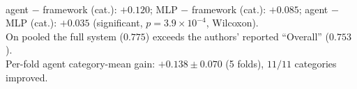 \documentclass[sn-basic]{sn-jnl}
\begin{document}
\begin{table}[t]\centering
\caption{CDnet2014, 5-fold scene-disjoint CV, every scene tested once, identical
held-out pixels, single scoring harness. Primary configuration: RGB CPB, all-64
framework, DeepLabV3+ guidance. Category-mean is the official CDnet metric; pooled is
the aggregation the authors report as ``Overall''.}
\label{tab:main}
\small
{}
\\[4pt]
\footnotesize
agent $-$ framework (cat.): $+0.120$; \; MLP $-$ framework (cat.): $+0.085$;\;
agent $-$ MLP (cat.): $+0.035$ (significant, $p=3.9\times10^{-4}$, Wilcoxon).\\
On pooled the full system ($0.775$) exceeds the authors' reported ``Overall''
($0.753$).\\
Per-fold agent category-mean gain: $+0.138 \pm 0.070$ (5 folds), $11/11$ categories
improved.
\end{table}
\end{document}
